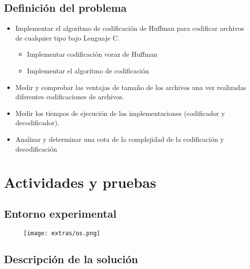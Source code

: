 \documentclass[12 pt]{report}
\begin{document}
\section{Definición del problema}
\begin{itemize}
\item Implementar el algoritmo de codificación de Huffman para codificar archivos de cualquier tipo bajo Lenguaje C.
  \begin{itemize}
  \item Implementar codificación voraz de Huffman
  \item Implementar el algoritmo de codificación
  \end{itemize}
  
\item Medir y comprobar las ventajas de tamaño de los archivos una vez realizadas diferentes codificaciones de archivos.
\item Medir los tiempos de ejecución de las implementaciones (codificador y decodificador).
\item Analizar y determinar una cota de la complejidad de la codificación y decodificación  
\end{itemize}


\chapter{Actividades y pruebas}

\section{Entorno experimental}
\begin{figure}[ht]
  \centering
  \texttt{[image: extras/os.png]}
  \caption{\label{Entorno experimental usado} }
\end{figure}
\newpage




\section{Descripción de la solución}
\end{document}
